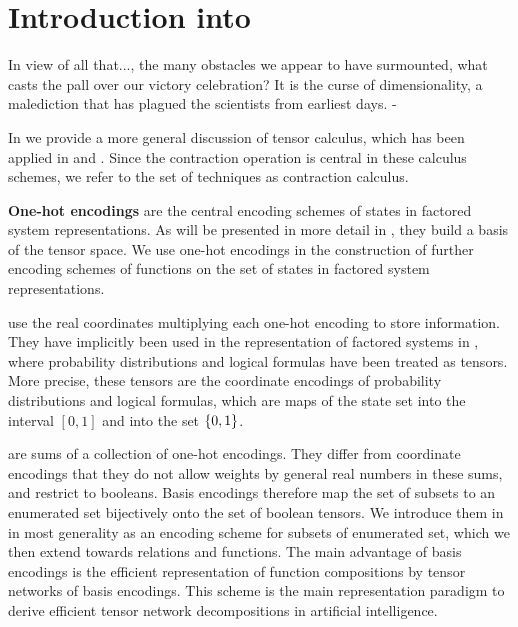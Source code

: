 \chapter{Introduction into }

\begin{highlight}
	In view of all that..., the many obstacles we appear to have surmounted, what casts the pall over our victory celebration?
	It is the curse of dimensionality, a malediction that has plagued the scientists from earliest days. - 
\end{highlight}

In  we provide a more general discussion of tensor calculus, which has been applied in  and .
Since the contraction operation is central in these calculus schemes, we refer to the set of techniques as contraction calculus.


\textbf{One-hot encodings} are the central encoding schemes of states in factored system representations.
As will be presented in more detail in , they build a basis of the tensor space.
We use one-hot encodings in the construction of further encoding schemes of functions on the set of states in factored system representations.

\textbf{\coordinateEncodings{}} use the real coordinates multiplying each one-hot encoding to store information.
They have implicitly been used in the representation of factored systems in , where probability distributions and logical formulas have been treated as tensors.
More precise, these tensors are the coordinate encodings of probability distributions and logical formulas, which are maps of the state set into the interval $[0,1]$ and into the set $\{0,1\}$.

\textbf{\basisEncodings{}} are sums of a collection of one-hot encodings.
They differ from coordinate encodings that they do not allow weights by general real numbers in these sums, and restrict to booleans.
Basis encodings therefore map the set of subsets to an enumerated set bijectively onto the set of boolean tensors.
We introduce them in  in most generality as an encoding scheme for subsets of enumerated set, which we then extend towards relations and functions.
The main advantage of basis encodings is the efficient representation of function compositions by tensor networks of basis encodings.
This scheme is the main representation paradigm to derive efficient tensor network decompositions in artificial intelligence.

